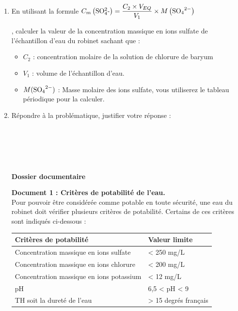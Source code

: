 \documentclass[11pt,a4paper]{article}
\newcommand{\cadreblanc}[1]{%
\medskip\framebox[\linewidth][c]{%
\rule{0mm}{#1mm}}\par
\medskip}
\newcommand\SA{\marginpar{\scalebox{.8}{\framebox[1.6ex]{\rule{0ex}{1.6ex}\raisebox{.75ex}{\rule{1.6ex}{.5pt}}}\hspace{-.3pt}\framebox[3.2ex]{S}}}}
\newcommand\R{\marginpar{\scalebox{.8}{\framebox[1.6ex]{\rule{0ex}{1.6ex}\raisebox{.75ex}{\rule{1.6ex}{.5pt}}}\hspace{-.3pt}\framebox[3.2ex]{R}}}}
\newcommand\V{\marginpar{\scalebox{.8}{\framebox[1.6ex]{\rule{0ex}{1.6ex}\raisebox{.75ex}{\rule{1.6ex}{.5pt}}}\hspace{-.3pt}\framebox[3.2ex]{V}}}}
\newcommand\C{\marginpar{\scalebox{.8}{\framebox[1.6ex]{\rule{0ex}{1.6ex}\raisebox{.75ex}{\rule{1.6ex}{.5pt}}}\hspace{-.3pt}\framebox[3.2ex]{C}}}}
\begin{document}
\begin{enumerate}
\vfill 


\newpage


\item En utilisant la formule \large{$C_m\left(\ce{{SO_4^{2}-}}\right)=\dfrac{C_2 \times V_{EQ}}{V_1} \times M\left(\ce{SO_4^{2}-}\right)$}

\normalsize
, calculer la valeur de la concentration massique en ions sulfate de l'échantillon d'eau du robinet sachant que : 


\begin{itemize}
    

    \item $C_2$ : concentration molaire de la solution de chlorure de baryum
    \item $V_1$ : volume de l'échantillon d'eau. 
    \item $M(\ce{SO_4^{2}-})$ : Masse molaire des ions sulfate, vous utiliserez le tableau périodique pour la calculer. 
\end{itemize}
    \cadreblanc{30}  \R \SA

    \item Répondre à la problématique, justifier votre réponse :   

        
    \dotfill \\[3mm]

    \dotfill \\[3mm]
    
    \dotfill \\[3mm]

    \dotfill \\[3mm]  \V \C

\vfill 


\begin{center}
    

\begin{mybox}
\begin{center}    
\textbf{\Large {Dossier documentaire}}\end{center}
\end{mybox}
\end{center}

\normalsize
\textbf{Document 1 : Critères de potabilité de l'eau. } \\
Pour pouvoir être considérée comme potable en toute sécurité, une eau du robinet doit vérifier plusieurs critères de potabilité. Certains de ces critères sont indiqués ci-dessous : 
\begin{center}
    

\begin{tabular}{|C{8cm}|C{4cm}|}
\hline
Critères de potabilité & Valeur limite \\
\hline
Concentration massique en ions sulfate & < 250 mg/L \\
\hline
Concentration massique en ions chlorure & < 200 mg/L \\
\hline
Concentration massique en ions potassium & < 12 mg/L \\
\hline
pH  & 6,5 < pH < 9 \\
\hline
TH soit la dureté de l'eau & > 15 degrés français \\
\hline




\end{tabular}
\end{center}
\end{enumerate}
\end{document}
